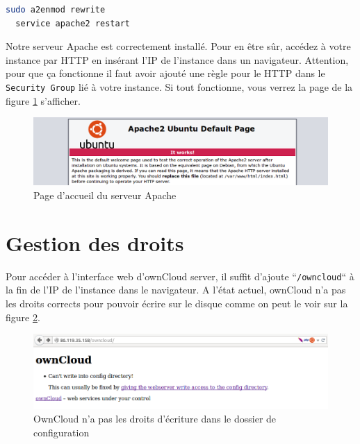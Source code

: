 \begin{lstlisting}[language=bash]
  sudo a2enmod rewrite
  service apache2 restart
\end{lstlisting}

  
  
Notre serveur Apache est correctement installé. Pour en être sûr, accédez à votre instance par HTTP en insérant l'IP de l'instance dans un navigateur. Attention, pour que ça fonctionne il faut avoir ajouté une règle pour le HTTP dans le \texttt{Security Group} lié à votre instance. Si tout fonctionne, vous verrez la page de la figure \ref{apacheisworking} s'afficher.


\begin{figure}[h]
  \centering
    \includegraphics[width=\linewidth]{img/apacheIsWorking.png}
  \caption{Page d'accueil du serveur Apache}
  \label{apacheisworking}
\end{figure}

\section{Gestion des droits}

Pour accéder à l'interface web d'ownCloud server, il suffit d'ajoute ``\texttt{/owncloud}`` à la fin de l'IP de l'instance dans le navigateur. A l'état actuel, ownCloud n'a pas les droits corrects pour pouvoir écrire sur le disque comme on peut le voir sur la figure \ref{nowriteaccess}.

\begin{figure}[h]
  \centering
    \includegraphics[width=\linewidth]{img/OCWriteAccess.png}
  \caption{OwnCloud n'a pas les droits d'écriture dans le dossier de configuration}
  \label{nowriteaccess}
\end{figure}

